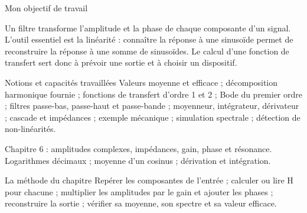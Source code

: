 \thispagestyle{mpsiFront}
\begin{docu}{Mon objectif de travail}\end{docu}

Un filtre transforme l’amplitude et la phase de chaque composante d’un signal. L’outil essentiel est la linéarité : connaître la réponse à une sinusoïde permet de reconstruire la réponse à une somme de sinusoïdes. Le calcul d’une fonction de transfert sert donc à prévoir une sortie et à choisir un dispositif.
\begin{loi}{Notions et capacités travaillées}
Valeurs moyenne et efficace ; décomposition harmonique fournie ; fonctions de transfert d’ordre 1 et 2 ; Bode du premier ordre ; filtres passe-bas, passe-haut et passe-bande ; moyenneur, intégrateur, dérivateur ; cascade et impédances ; exemple mécanique ; simulation spectrale ; détection de non-linéarités.
\end{loi}

Chapitre 6 : amplitudes complexes, impédances, gain, phase et résonance. Logarithmes décimaux ; moyenne d’un cosinus ; dérivation et intégration.

\begin{methode}{La méthode du chapitre}
Repérer les composantes de l’entrée ; calculer ou lire H pour chacune ; multiplier les amplitudes par le gain et ajouter les phases ; reconstruire la sortie ; vérifier sa moyenne, son spectre et sa valeur efficace.
\end{methode}


